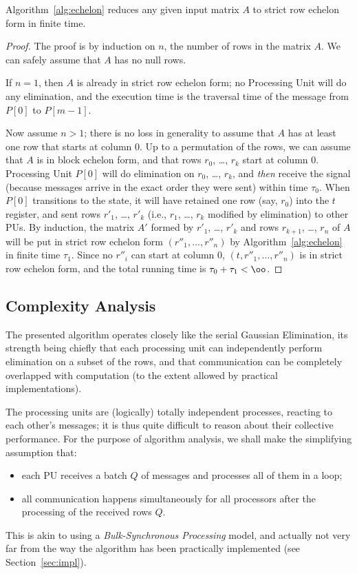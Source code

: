 \begin{theorem}
  Algorithm~\ref{alg:echelon} reduces any given input matrix $A$ to
  strict row echelon form in finite time.
\end{theorem}
\begin{proof}
  The proof is by induction on $n$, the number of rows in the matrix
  $A$.  We can safely assume that $A$ has no null rows.

  If $n=1$, then $A$ is already in strict row echelon form; no
  Processing Unit will do any elimination, and the execution time is
  the traversal time of the  message from $P[0]$ to
  $P[m-1]$.

  Now assume $n > 1$; there is no loss in generality to assume that
  $A$ has at least one row that starts at column $0$.  Up to a
  permutation of the rows, we can assume that $A$ is in block
  echelon form, and that rows $r_0$, \ldots, $r_k$ start at column
  $0$. Processing Unit $P[0]$ will do elimination on $r_0$, \ldots,
  $r_k$, and \emph{then} receive the  signal (because
  messages arrive in the exact order they were sent) within time
  $\tau_0$.  When $P[0]$ transitions to the  state, it will
  have retained one row (say, $r_0$) into the $t$ register, and sent
  rows $r'_1$, \ldots, $r'_k$ (i.e., $r_1$, \ldots, $r_k$ modified by
  elimination) to other PUs. By induction, the matrix $A'$ formed by
  $r'_1$, \ldots, $r'_k$ and rows $r_{k+1}$, \ldots, $r_n$ of $A$ will
  be put in strict row echelon form $(r''_1, \ldots, r''_n)$ by
  Algorithm~\ref{alg:echelon} in finite time $\tau_1$.  Since no
  $r''_i$ can start at column 0, $(t, r''_1, \ldots, r''_n)$ is in
  strict row echelon form, and the total running time is $\tau_0 +
  \tau_1 < \oo$.
\end{proof}

\subsection{Complexity Analysis}
\label{sec:complexity}

The presented algorithm operates closely like the serial Gaussian
Elimination, its strength being chiefly that each processing unit can
independently perform elimination on a subset of the rows, and that
communication can be completely overlapped with computation (to the
extent allowed by practical implementations).

The processing units are (logically) totally independent processes,
reacting to each other's messages; it is thus quite difficult to
reason about their collective performance.  For the purpose of
algorithm analysis, we shall make the simplifying  assumption that:
\begin{itemize}
\item each PU receives a batch $Q$ of messages and processes all of
  them in a loop;
\item all communication happens simultaneously for all processors
  after the processing of the received rows $Q$.
\end{itemize}
This is akin to using a \emph{Bulk-Synchronous Processing} model, and actually not very far from the way the
algorithm has been practically implemented (see
Section~\ref{sec:impl}). 

